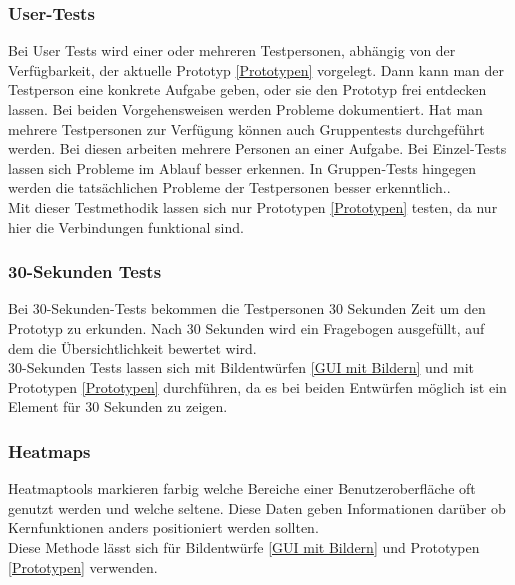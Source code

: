 \documentclass[12pt,a4paper]{article}
\begin{document}
\subsubsection{User-Tests}
\label{User-Tests}
Bei User Tests wird einer oder mehreren Testpersonen, abhängig von der Verfügbarkeit, der aktuelle Prototyp \ref{Prototypen} vorgelegt. Dann kann man der Testperson eine konkrete Aufgabe geben, oder sie den Prototyp frei entdecken lassen. Bei beiden Vorgehensweisen werden Probleme dokumentiert. Hat man mehrere Testpersonen zur Verfügung können auch Gruppentests durchgeführt werden. Bei diesen arbeiten mehrere Personen an einer Aufgabe. Bei Einzel-Tests lassen sich Probleme im Ablauf besser erkennen. In Gruppen-Tests hingegen werden die tatsächlichen Probleme der Testpersonen besser erkenntlich.\cite{BASTIEN2010e18}. \\
Mit dieser Testmethodik lassen sich nur Prototypen \ref{Prototypen} testen, da nur hier die Verbindungen funktional sind.
\subsubsection{30-Sekunden Tests}
\label{30-Sekunden Tests}
Bei 30-Sekunden-Tests bekommen die Testpersonen 30 Sekunden Zeit um den Prototyp zu erkunden. Nach 30 Sekunden wird ein Fragebogen ausgefüllt, auf dem die Übersichtlichkeit bewertet wird\cite{vsimek2015usability}. \\
30-Sekunden Tests lassen sich mit Bildentwürfen \ref{GUI mit Bildern} und mit Prototypen \ref{Prototypen} durchführen, da es bei beiden Entwürfen möglich ist ein Element für 30 Sekunden zu zeigen.
\subsubsection{Heatmaps}
\label{Heatmaps}
Heatmaptools markieren farbig welche Bereiche einer Benutzeroberfläche oft genutzt werden und welche seltene\cite{10.1145/2470654.2466442}. Diese Daten geben Informationen darüber ob Kernfunktionen anders positioniert werden sollten.\\
Diese Methode lässt sich für Bildentwürfe \ref{GUI mit Bildern} und Prototypen \ref{Prototypen} verwenden.
\end{document}
